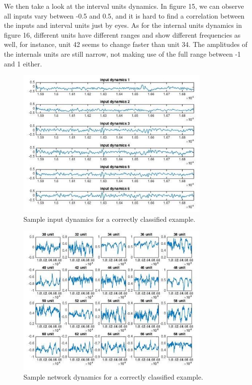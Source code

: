 \documentclass[a4paper,11pt,oneside]{article}
\begin{document}
We then take a look at the interval units dynamics. In figure 15, we can observe all inputs vary between -0.5 and 0.5, and it is hard to find a correlation between the inputs and interval units just by eyes. As for the internal units dynamics in figure 16, different units have different ranges and show different frequencies as well, for instance, unit 42 seems to change faster than unit 34. The amplitudes of the internals units are still narrow, not making use of the full range between -1 and 1 either.
\begin{figure}[h!]
	\centering
	\includegraphics[width=0.85\textwidth]{img/rightIns2}
	\caption{Sample input dynamics for a correctly classified example.}
\end{figure}
\begin{figure}[h!]
	\centering
	\includegraphics[width=0.85\textwidth]{img/rightIns}
	\caption{Sample network dynamics for a correctly classified example.}
\end{figure}
\end{document}
